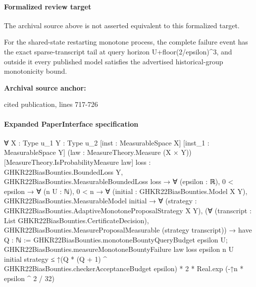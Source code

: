 \documentclass[10pt]{article}
\begin{document}
\paragraph{Formalized review target}
The archival source above is not asserted equivalent to this formalized target.
\begin{ReviewVerbatim}
For the shared-state restarting monotone process, the complete failure event has the exact sparse-transcript tail at query horizon U+floor(2/epsilon)^3, and outside it every published model satisfies the advertised historical-group monotonicity bound.
\end{ReviewVerbatim}

\textbf{Archival source anchor:} {\footnotesize\raggedright cited publication, lines 717-\allowbreak{}726\par}
\paragraph{Expanded PaperInterface specification}
\begin{ReviewVerbatim}
∀ {X : Type u_1} {Y : Type u_2} [inst : MeasurableSpace X] [inst_1 : MeasurableSpace Y]
  (law : MeasureTheory.Measure (X × Y)) [MeasureTheory.IsProbabilityMeasure law]
  {loss : GHKR22BiasBounties.BoundedLoss Y},
  GHKR22BiasBounties.MeasurableBoundedLoss loss →
    ∀ (epsilon : ℝ),
      0 < epsilon →
        ∀ (n U : ℕ),
          0 < n →
            ∀ (initial : GHKR22BiasBounties.Model X Y),
              GHKR22BiasBounties.MeasurableModel initial →
                ∀ (strategy : GHKR22BiasBounties.AdaptiveMonotoneProposalStrategy X Y),
                  (∀ (transcript : List GHKR22BiasBounties.CertificateDecision),
                      GHKR22BiasBounties.MeasureProposalMeasurable (strategy transcript)) →
                    have Q : ℕ := GHKR22BiasBounties.monotoneBountyQueryBudget epsilon U;
                    GHKR22BiasBounties.measureMonotoneBountyFailure law loss epsilon n U initial strategy ≤
                      ↑(Q * (Q + 1) ^ GHKR22BiasBounties.checkerAcceptanceBudget epsilon) * 2 *
                        Real.exp (-↑n * epsilon ^ 2 / 32)
\end{ReviewVerbatim}
\end{document}
